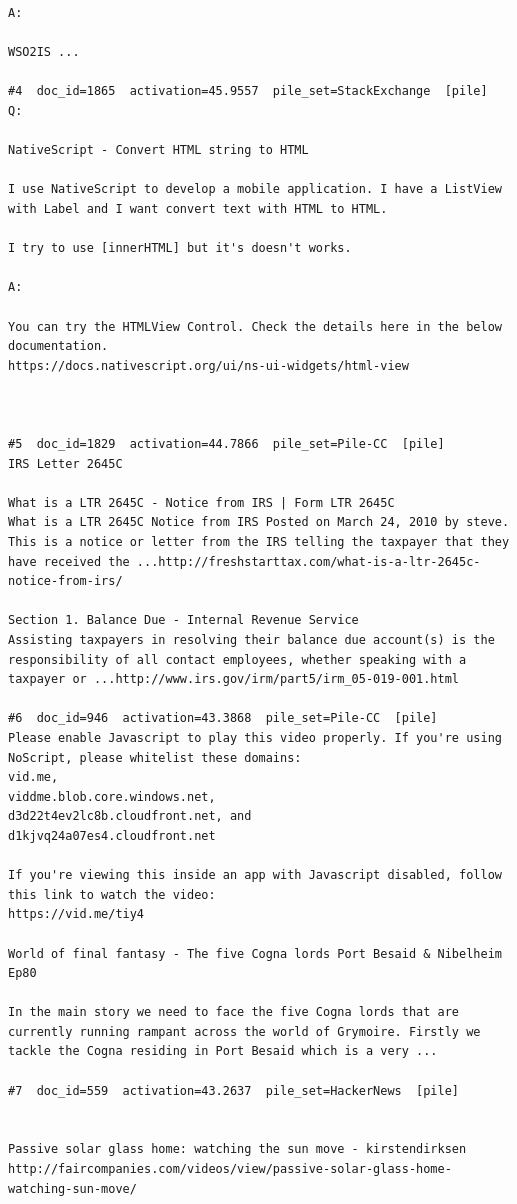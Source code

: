 \begin{verbatim}
A:

WSO2IS ...

#4  doc_id=1865  activation=45.9557  pile_set=StackExchange  [pile]
Q:

NativeScript - Convert HTML string to HTML

I use NativeScript to develop a mobile application. I have a ListView with Label and I want convert text with HTML to HTML.

I try to use [innerHTML] but it's doesn't works.

A:

You can try the HTMLView Control. Check the details here in the below documentation.
https://docs.nativescript.org/ui/ns-ui-widgets/html-view



#5  doc_id=1829  activation=44.7866  pile_set=Pile-CC  [pile]
IRS Letter 2645C

What is a LTR 2645C - Notice from IRS | Form LTR 2645C
What is a LTR 2645C Notice from IRS Posted on March 24, 2010 by steve. This is a notice or letter from the IRS telling the taxpayer that they have received the ...http://freshstarttax.com/what-is-a-ltr-2645c-notice-from-irs/

Section 1. Balance Due - Internal Revenue Service
Assisting taxpayers in resolving their balance due account(s) is the responsibility of all contact employees, whether speaking with a taxpayer or ...http://www.irs.gov/irm/part5/irm_05-019-001.html

#6  doc_id=946  activation=43.3868  pile_set=Pile-CC  [pile]
Please enable Javascript to play this video properly. If you're using
NoScript, please whitelist these domains:
vid.me,
viddme.blob.core.windows.net,
d3d22t4ev2lc8b.cloudfront.net, and
d1kjvq24a07es4.cloudfront.net

If you're viewing this inside an app with Javascript disabled, follow
this link to watch the video:
https://vid.me/tiy4

World of final fantasy - The five Cogna lords Port Besaid & Nibelheim Ep80

In the main story we need to face the five Cogna lords that are currently running rampant across the world of Grymoire. Firstly we tackle the Cogna residing in Port Besaid which is a very ...

#7  doc_id=559  activation=43.2637  pile_set=HackerNews  [pile]


Passive solar glass home: watching the sun move - kirstendirksen
http://faircompanies.com/videos/view/passive-solar-glass-home-watching-sun-move/


\end{verbatim}
